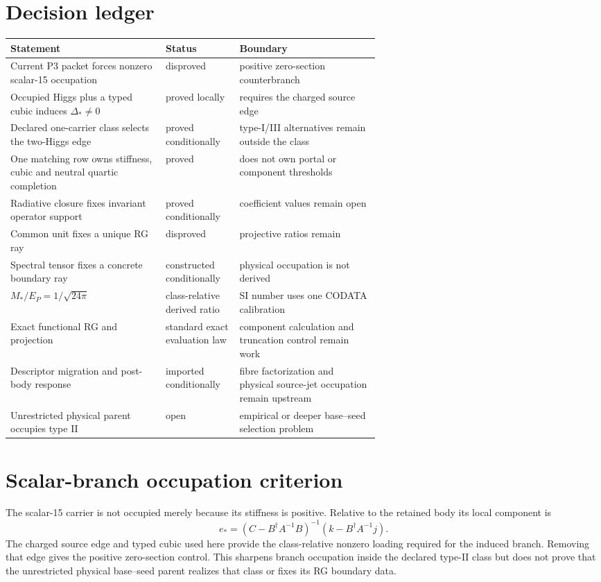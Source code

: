 \documentclass[11pt]{article}
\begin{document}
\section{Decision ledger}

\begin{center}\small
\begin{tabularx}{0.96\linewidth}{@{}p{0.42\linewidth}p{0.20\linewidth}X@{}}
\toprule
Statement & Status & Boundary\\
\midrule
Current P3 packet forces nonzero scalar-15 occupation & disproved & positive
zero-section counterbranch\\
Occupied Higgs plus a typed cubic induces $\Delta_*\ne0$ & proved locally &
requires the charged source edge\\
Declared one-carrier class selects the two-Higgs edge & proved conditionally &
type-I/III alternatives remain outside the class\\
One matching row owns stiffness, cubic and neutral quartic completion & proved
& does not own portal or component thresholds\\
Radiative closure fixes invariant operator support & proved conditionally &
coefficient values remain open\\
Common unit fixes a unique RG ray & disproved & projective ratios remain\\
Spectral tensor fixes a concrete boundary ray & constructed conditionally &
physical occupation is not derived\\
$M_*/E_P=1/\sqrt{24\pi}$ & class-relative derived ratio & SI number uses one
CODATA calibration\\
Exact functional RG and projection & standard exact evaluation law & component
calculation and truncation control remain work\\
Descriptor migration and post-body response & imported conditionally & fibre
factorization and physical source-jet occupation remain upstream\\
Unrestricted physical parent occupies type II & open & empirical or deeper
base--seed selection problem\\
\bottomrule
\end{tabularx}
\end{center}

\section{Scalar-branch occupation criterion}

The scalar-15 carrier is not occupied merely because its stiffness is
positive. Relative to the retained body its local component is
\[
 e_*=(C-B^\dagger A^{-1}B)^{-1}
      (k-B^\dagger A^{-1}j).
\]
The charged source edge and typed cubic used here provide the class-relative
nonzero loading required for the induced branch. Removing that edge gives the
positive zero-section control. This sharpens branch occupation inside the
declared type-II class but does not prove that the unrestricted physical
base--seed parent realizes that class or fixes its RG boundary data.
\end{document}

